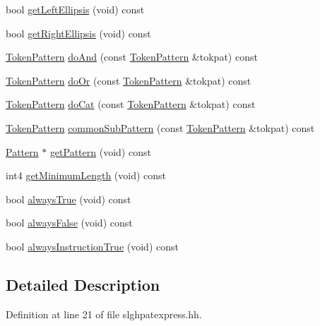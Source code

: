 \begin{DoxyCompactItemize}
\item 
bool \mbox{\hyperlink{class_token_pattern_a210e879f22d138ce4729978c61c1ae07}{get\+Left\+Ellipsis}} (void) const
\item 
bool \mbox{\hyperlink{class_token_pattern_aacd35c2555285d248400360e9bd9526f}{get\+Right\+Ellipsis}} (void) const
\item 
\mbox{\hyperlink{class_token_pattern}{Token\+Pattern}} \mbox{\hyperlink{class_token_pattern_a6d07795355a0042e823853489b30e32c}{do\+And}} (const \mbox{\hyperlink{class_token_pattern}{Token\+Pattern}} \&tokpat) const
\item 
\mbox{\hyperlink{class_token_pattern}{Token\+Pattern}} \mbox{\hyperlink{class_token_pattern_a9e4586d96306831e4c54930aa4097756}{do\+Or}} (const \mbox{\hyperlink{class_token_pattern}{Token\+Pattern}} \&tokpat) const
\item 
\mbox{\hyperlink{class_token_pattern}{Token\+Pattern}} \mbox{\hyperlink{class_token_pattern_adaf0fe329004ab5e975f4d2772fc016e}{do\+Cat}} (const \mbox{\hyperlink{class_token_pattern}{Token\+Pattern}} \&tokpat) const
\item 
\mbox{\hyperlink{class_token_pattern}{Token\+Pattern}} \mbox{\hyperlink{class_token_pattern_abdd5d386c2262819c8423bb4454e3e70}{common\+Sub\+Pattern}} (const \mbox{\hyperlink{class_token_pattern}{Token\+Pattern}} \&tokpat) const
\item 
\mbox{\hyperlink{class_pattern}{Pattern}} $\ast$ \mbox{\hyperlink{class_token_pattern_ac757e6b2e8d8837f950325ca8669ec43}{get\+Pattern}} (void) const
\item 
int4 \mbox{\hyperlink{class_token_pattern_aec7adadfdac70df18433ca8599dfb37f}{get\+Minimum\+Length}} (void) const
\item 
bool \mbox{\hyperlink{class_token_pattern_a0a1c7d3ae8b9964908decdcd5c8e2e47}{always\+True}} (void) const
\item 
bool \mbox{\hyperlink{class_token_pattern_a9a4306ae8cae75e5597e5a83ceac491e}{always\+False}} (void) const
\item 
bool \mbox{\hyperlink{class_token_pattern_ab58b4509cd534fa626618afd06cd37cd}{always\+Instruction\+True}} (void) const
\end{DoxyCompactItemize}


\subsection{Detailed Description}


Definition at line 21 of file slghpatexpress.\+hh.



